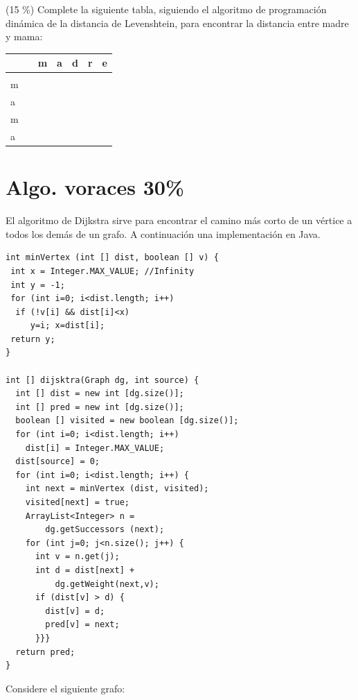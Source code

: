 \documentclass[twocolumn]{article}
\begin{document}

(15 \%) Complete la siguiente tabla, siguiendo el algoritmo de programación dinámica de la distancia de Levenshtein, para encontrar
la distancia entre madre y mama:\\

\begin{tabular}{| l  | l  | l  | l  | l  | l  | l |}
\hline
  & & m & a & d & r & e \\
 \hline
  & &  &  &  &  &  \\
  \hline
m & &  &  &  &  &  \\
\hline
a & &  &  &  &  &  \\
\hline
m & &  &  &  &  &  \\
\hline
a & &  &  &  &  &  \\
\hline
\end{tabular}


\section{Algo. voraces 30\%}
El algoritmo de Dijkstra sirve para encontrar el camino más corto
de un vértice a todos los demás de un grafo. A continuación una
implementación en Java.

{\small
\begin{verbatim}
int minVertex (int [] dist, boolean [] v) {
 int x = Integer.MAX_VALUE; //Infinity
 int y = -1;   
 for (int i=0; i<dist.length; i++) 
  if (!v[i] && dist[i]<x) 
     y=i; x=dist[i];
 return y;
}
      
int [] dijsktra(Graph dg, int source) {
  int [] dist = new int [dg.size()]; 
  int [] pred = new int [dg.size()]; 
  boolean [] visited = new boolean [dg.size()]; 
  for (int i=0; i<dist.length; i++) 
    dist[i] = Integer.MAX_VALUE; 
  dist[source] = 0;
  for (int i=0; i<dist.length; i++) {
    int next = minVertex (dist, visited);
    visited[next] = true;
    ArrayList<Integer> n =
        dg.getSuccessors (next); 
    for (int j=0; j<n.size(); j++) {
      int v = n.get(j);
      int d = dist[next] + 
          dg.getWeight(next,v);
      if (dist[v] > d) {
        dist[v] = d;
        pred[v] = next;
      }}}
  return pred;  
}
\end{verbatim}
}

Considere el siguiente grafo:
\end{document}
